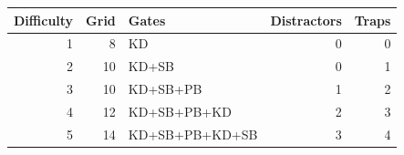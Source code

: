 \begin{tabular}{rrlrr}
\toprule
Difficulty & Grid & Gates & Distractors & Traps \\
\midrule
1 & 8 & KD & 0 & 0 \\
2 & 10 & KD+SB & 0 & 1 \\
3 & 10 & KD+SB+PB & 1 & 2 \\
4 & 12 & KD+SB+PB+KD & 2 & 3 \\
5 & 14 & KD+SB+PB+KD+SB & 3 & 4 \\
\bottomrule
\end{tabular}
